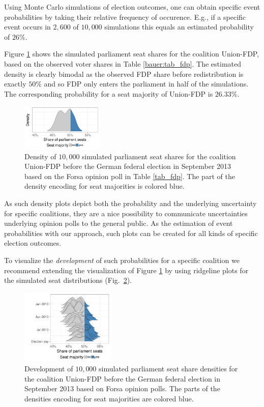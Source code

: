 \documentclass[smallcondensed]{svjour3}     %
\begin{document}
Using Monte Carlo simulations of election outcomes, one can obtain
specific event probabilities by taking their relative frequency of
occurence. E.g., if a specific event occurs in $2,600$ of $10,000$
simulations this equals an estimated probability of $26\%$.

Figure \ref{fig:seatDist} shows the simulated
parliament seat shares for the coalition Union-FDP, based on the observed
voter shares in Table \ref{bauer:tab_fdp}. The estimated density is clearly bimodal
as the observed FDP share before redistribution is exactly $50\%$ and
so FDP only enters the parliament in half of the simulations. The corresponding
probability for a seat majority of Union-FDP is $26.33\%$.

\begin{figure}[!ht]\centering
\includegraphics[width=0.35\textwidth]{figures/bauer_seatDist_lastPreelectionPoll2013.pdf}
\caption{Density of $10,000$ simulated parliament seat shares for the coalition Union-FDP before the German federal election in September 2013 based on the Forsa opinion poll in Table \ref{tab_fdp}. The part of the density encoding for seat majorities is colored blue.
\label{fig:seatDist}
}
\end{figure}

As such density plots depict both the probability and the underlying
uncertainty for specific coalitions, they are a nice possibility to communicate
uncertainties underlying opinion polls to the general public. As the estimation
of event probabilities with our approach, such plots can be created for all
kinds of specific election outcomes.

To visualize the {\it development} of such probabilities
for a specific coalition we recommend extending the visualization of Figure \ref{fig:seatDist} by using ridgeline plots \citep{wilke_2017} for the simulated seat distributions (Fig.~\ref{fig:seatDist_time}).

\begin{figure}[!ht]\centering
\includegraphics[width=0.4\textwidth]{figures/bauer_seatDist_time.pdf}
\caption{Development of $10,000$ simulated parliament seat share densities for the coalition Union-FDP before the German federal election in September 2013 based on Forsa opinion polls. The parts of the densities encoding for seat majorities are colored blue.
\label{fig:seatDist_time}
}
\end{figure}
\end{document}
